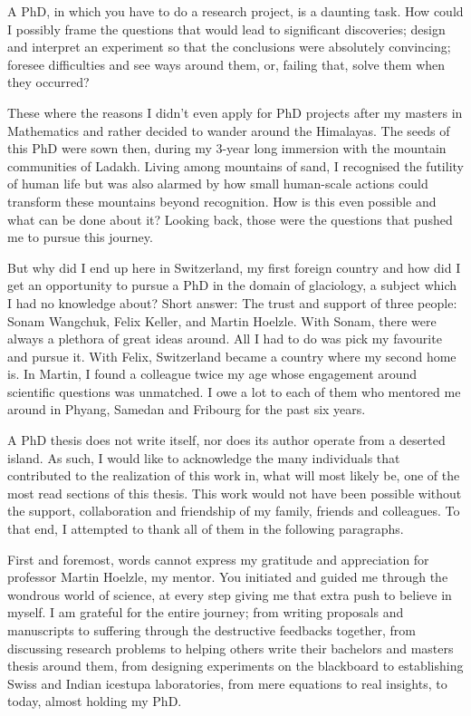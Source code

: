 %
\label{sec:acknowledgement}

A PhD, in which you have to do a research project, is a daunting task. How could I possibly frame the questions
that would lead to significant discoveries; design and interpret an experiment so that the conclusions were
absolutely convincing; foresee difficulties and see ways around them, or, failing that, solve them when they
occurred?

These where the reasons I didn't even apply for PhD projects after my masters in Mathematics and rather decided
to wander around the Himalayas. The seeds of this PhD were sown then, during my 3-year long immersion with the
mountain communities of Ladakh. Living among mountains of sand, I recognised the futility of human life but was
also alarmed by how small human-scale actions could transform these mountains beyond recognition. How is this
even possible and what can be done about it? Looking back, those were the questions that pushed me to pursue
this journey. 

But why did I end up here in Switzerland, my first foreign country and how did I get an opportunity to pursue a
PhD in the domain of glaciology, a subject which I had no knowledge about? Short answer: The trust and support
of three people: Sonam Wangchuk, Felix Keller, and Martin Hoelzle. With Sonam, there were always a plethora of
great ideas around. All I had to do was pick my favourite and pursue it. With Felix, Switzerland became a
country where my second home is. In Martin, I found a colleague twice my age whose engagement around scientific
questions was unmatched. I owe a lot to each of them who mentored me around in Phyang, Samedan and Fribourg for
the past six years.

A PhD thesis does not write itself, nor does its author operate from a deserted island. As such, I would like to
acknowledge the many individuals that contributed to the realization of this work in, what will most likely be,
one of the most read sections of this thesis. This work would not have been possible without the support,
collaboration and friendship of my family, friends and colleagues. To that end, I attempted to thank all of them
in the following paragraphs.

First and foremost, words cannot express my gratitude and appreciation for professor Martin Hoelzle, my mentor.
You initiated and guided me through the wondrous world of science, at every step giving me that extra push to
believe in myself. I am grateful for the entire journey; from writing proposals and manuscripts to suffering
through the destructive feedbacks together, from discussing research problems to helping others write their
bachelors and masters thesis around them, from designing experiments on the blackboard to establishing Swiss and
Indian icestupa laboratories, from mere equations to real insights, to today, almost holding my PhD.

